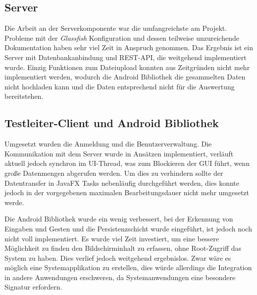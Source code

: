\subsection{Server}
Die Arbeit an der Serverkomponente war die umfangreichste am Projekt.
Probleme mit der \emph{Glassfish} Konfiguration und dessen teilweise unzureichende Dokumentation haben sehr viel Zeit in Anspruch genommen.
Das Ergebnis ist ein Server mit Datenbankanbindung und \ac{REST}-API, die weitgehend implementiert wurde.
Einzig Funktionen zum Dateiupload konnten aus Zeitgründen nicht mehr implementiert werden, wodurch die Android Bibliothek die gesammelten Daten nicht hochladen kann und die Daten entsprechend nicht für die Auswertung bereitstehen.

\subsection{Testleiter-Client und Android Bibliothek}
Umgesetzt wurden die Anmeldung und die Benutzerverwaltung.
Die Kommunikation mit dem Server wurde in Ansätzen implementiert, verläuft aktuell jedoch synchron im UI-Thread, was zum Blockieren der \ac{GUI} führt, wenn große Datenmengen abgerufen werden.
Um dies zu verhindern sollte der Datentransfer in JavaFX Tasks nebenläufig durchgeführt werden, dies konnte jedoch in der vorgegebenen maximalen Bearbeitungsdauer nicht mehr umgesetzt werde.

Die Android Bibliothek wurde ein wenig verbessert, bei der Erkennung von Eingaben und Gesten und die Persistenzschicht wurde eingeführt, ist jedoch noch nicht voll implementiert.
Es wurde viel Zeit investiert, um eine bessere Möglichkeit zu finden den Bildschirminhalt zu erfassen, ohne Root-Zugriff das System zu haben.
Dies verlief jedoch weitgehend ergebnislos.
Zwar wäre es möglich eine Systemapplikation zu erstellen, dies würde allerdings die Integration in andere Anwendungen erschweren, da Systemanwendungen eine besondere Signatur erfordern. 